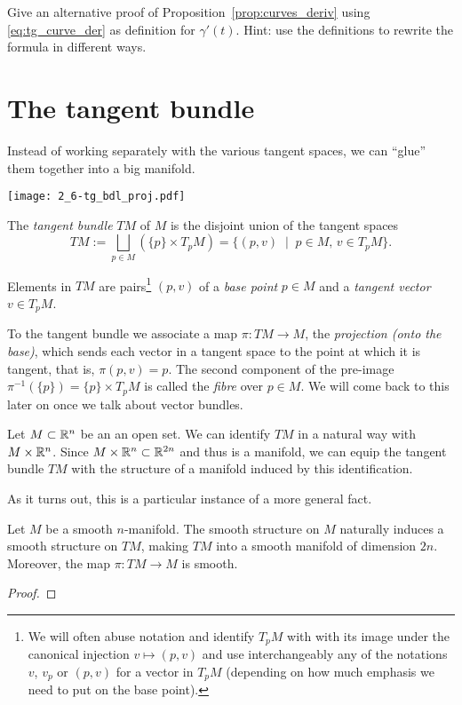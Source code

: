 \begin{exe}
    Give an alternative proof of Proposition~\ref{prop:curves_deriv} using \eqref{eq:tg_curve_der} as definition for $\gamma'(t)$.
    Hint: use the definitions to rewrite the formula in different ways.
\end{exe}

\section{The tangent bundle}

Instead of working separately with the various tangent spaces, we can ``glue'' them together into a big manifold.

\begin{marginfigure}
    \texttt{[image: 2\_6-tg\_bdl\_proj.pdf]}
\end{marginfigure}
\begin{defn}
    The \emph{tangent bundle} $TM$ of $M$ is the disjoint union of the tangent spaces
    \begin{equation}
        TM := \bigsqcup_{p\in M}\left(\{p\}\times T_pM\right)
           = \{(p,v) \;\mid\; p\in M,\, v\in T_pM\}.
    \end{equation}    
\end{defn}

Elements in $TM$ are pairs\footnote{We will often abuse notation and identify $T_pM$ with with its image under the canonical injection $v\mapsto(p,v)$ and use interchangeably any of the notations $v$, $v_p$ or $(p,v)$ for a vector in $T_pM$ (depending on how much emphasis we need to put on the base point).} $(p,v)$ of a \emph{base point} $p\in M$ and a \emph{tangent vector} $v\in T_pM$.

To the tangent bundle we associate a map $\pi:TM \to M$, the \emph{projection (onto the base)}, which sends each vector in a tangent space to the point at which it is tangent, that is, $\pi(p,v) = p$.
The second component of the pre-image $\pi^{-1}(\{p\}) = \{p\}\times T_pM$ is called the \emph{fibre} over $p\in M$.
We will come back to this later on once we talk about vector bundles.

\begin{ex}
    Let $M\subset \mathbb{R}^n$ be an an open set.
    We can identify $TM$ in a natural way with $M\times\mathbb{R}^n$.
    Since $M\times\mathbb{R}^n \subset \mathbb{R}^{2n}$ and thus is a manifold, we can equip the tangent bundle $TM$ with the structure of a manifold induced by this identification.
\end{ex}

As it turns out, this is a particular instance of a more general fact.

\begin{thm}
    Let $M$ be a smooth $n$-manifold.
    The smooth structure on $M$ naturally induces a smooth structure on $TM$, making $TM$ into a smooth manifold of dimension $2n$.
    Moreover, the map $\pi: TM \to M$ is smooth.
\end{thm}
\begin{proof}
    \TODO
\end{proof}
